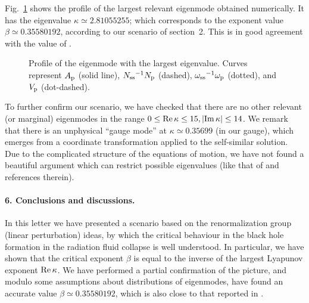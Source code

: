 Fig.~\ref{fig2} shows the profile of the largest
relevant eigenmode obtained numerically.
It has the eigenvalue $\kappa \simeq 2.81055255$; which corresponds to
the exponent value $\beta \simeq 0.35580192$, according to our scenario of
section~2.  This is in good agreement with the value of \cite{EvCo94}.


%
\begin{figure}
\begin{center}
{ }
\end{center}
\caption{Profile of the eigenmode with the largest eigenvalue.
        Curves represent $A_{\rm p}$ (solid
        line), $N_{\rm ss}{}^{-1}N_{\rm p}$ (dashed),
        $\omega_{\rm ss}{}^{-1}\omega_{\rm p}$ (dotted),
        and $V_{\rm p}$ (dot-dashed).}
\label{fig2}
\end{figure}
%

To further confirm our scenario,
we have checked that there are no  other relevant (or marginal)
eigenmodes in the range
$0 \leq {\rm Re \,} \kappa \leq 15, | {\rm Im \,} \kappa | \leq 14$.
We remark that there is an unphysical ``gauge mode''
at $\kappa \simeq 0.35699$ (in our gauge), which emerges from
a coordinate transformation
applied to the self-similar solution.
Due to the complicated structure of the equations of
motion, we have not found a beautiful argument which can restrict
possible eigenvalues (like that of \cite{Ch75} and
references therein).




\paragraph*{6. Conclusions and discussions.}
\label{conc}

In this letter we have presented a scenario based on the
renormalization group (linear perturbation) ideas, by which
the critical behaviour in the black hole formation in
the radiation fluid collapse is well understood.  In particular,
we have shown that the critical exponent $\beta$ is equal to
the inverse of the largest Lyapunov exponent ${\rm Re \,} \kappa$.
We have
performed a partial confirmation of the picture, and modulo
some assumptions about distributions of eigenmodes, have found
an accurate value  $\beta \simeq 0.35580192$, which is also close to
that reported in \cite{EvCo94}.


